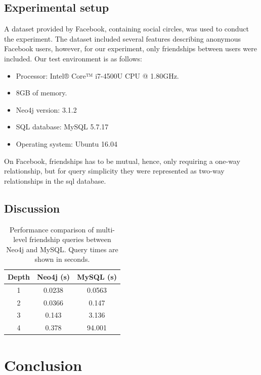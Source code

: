 \documentclass[a4paper, 12pt, conference]{IEEEtran}
\begin{document}
\subsection{Experimental setup}
A dataset provided by Facebook, containing social circles, was used to conduct the experiment.
The dataset included several features describing anonymous Facebook users, however, for our experiment, only friendships between users were included.
Our test environment is as follows: 
\begin{itemize}
	\item Processor: Intel® Core™ i7-4500U CPU @ 1.80GHz.
	\item 8GB of memory. 
	\item Neo4j version: 3.1.2
	\item SQL database: MySQL 5.7.17
	\item Operating system: Ubuntu 16.04
\end{itemize}
On Facebook, friendships has to be mutual, hence, only requiring a one-way relationship, but for query simplicity they were represented as two-way relationships in the sql database.
\subsection{Discussion}
\begin{table}[t]
	\centering
	\begin{tabular}{c|c|c}
		\textbf{Depth} & \textbf{Neo4j} (s) & \textbf{MySQL} (s) \\ \hline
		1 & 0.0238 & 0.0563 \\ \hline
		2 & 0.0366 & 0.147 \\ \hline
		3 & 0.143 & 3.136 \\ \hline
		4 & 0.378 & 94.001 \\
	\end{tabular}
	\caption{Performance comparison of multi-level friendship queries between Neo4j and MySQL. Query times are shown in seconds.}
\end{table}


\section{Conclusion}



\newpage



\end{document}
